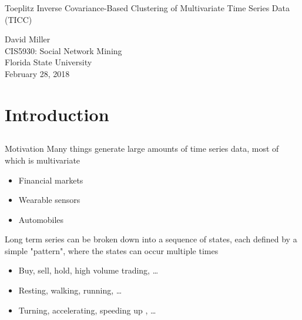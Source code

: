 \documentclass{beamer}
\DeclareRobustCommand{\mybox}[2][gray!20]{%
	\begin{tcolorbox}[   %
		breakable,
		left=0pt,
		right=0pt,
		top=0pt,
		bottom=0pt,
		colback=#1,
		colframe=#1,
		width=\dimexpr\textwidth\relax, 
		enlarge left by=0mm,
		boxsep=5pt,
		arc=0pt,outer arc=0pt,
		]
		#2
	\end{tcolorbox}
}
\begin{document}
\begin{frame}
	\mybox{\centering \Large Toeplitz Inverse Covariance-Based Clustering of
		Multivariate Time Series Data (TICC)}
	\vspace{1.5cm}
	\centering
	{\Large	David Miller} \\ \vspace{.5cm}
	{\Large CIS5930: Social Network Mining} \\
	{\Large Florida State University} \\
	{\Large February 28, 2018}
	
\end{frame}

\section{Introduction}
\subsection{}

\begin{frame}{Motivation}
	Many things generate large amounts of time series data, most of which is multivariate
	\begin{itemize}
		\item Financial markets
		\item Wearable sensors
		\item Automobiles
	\end{itemize}
	Long term series can be broken down into a sequence of states, each defined by a simple "pattern", where the states can occur multiple times 
	\begin{itemize}
		\item Buy, sell, hold, high volume trading, \dots
		\item Resting, walking, running, \dots
		\item Turning, accelerating, speeding up , \dots
	\end{itemize}
\end{frame}

\end{document}
